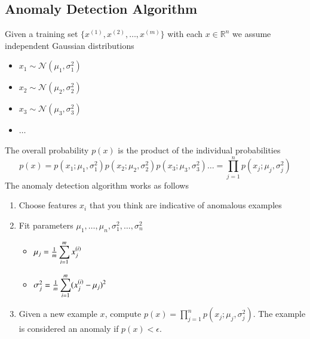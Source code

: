 \documentclass[a4paper,twoside,10pt]{article}
\begin{document}
\subsection{Anomaly Detection Algorithm}\label{cha:anomaly}
Given a training set $\{x^{(1)},x^{(2)},\ldots,x^{(m)}\}$ with each $x\in\mathbb{R}^n$
we assume independent Gaussian distributions
\begin{itemize}
\item $x_1\sim\mathcal{N}(\mu_1,\sigma^2_1)$
\item $x_2\sim\mathcal{N}(\mu_2,\sigma^2_2)$
\item $x_3\sim\mathcal{N}(\mu_3,\sigma^2_3)$
\item $\ldots$
\end{itemize}
The overall probability $p(x)$ is the product of the individual probabilities
\begin{equation*}
  p(x)=p(x_1;\mu_1,\sigma_1^2) p(x_2;\mu_2,\sigma_2^2) p(x_3;\mu_3,\sigma_3^2) \ldots=
  \prod_{j=1}^n p(x_j;\mu_j,\sigma_j^2)
\end{equation*}
The anomaly detection algorithm works as follows
\begin{enumerate}
  \item Choose features $x_i$ that you think are indicative of anomalous examples
  \item Fit parameters $\mu_1,\ldots,\mu_n,\sigma_1^2,\ldots,\sigma_n^2$
    \begin{itemize}
    \item $\mu_j=\frac{1}{m}\displaystyle\sum_{i=1}^mx^{(i)}_j$
    \item $\sigma_j^2=\frac{1}{m}\displaystyle\sum_{i=1}^m(x^{(i)}_j-\mu_j)^2$
    \end{itemize}
  \item Given a new example $x$, compute $p(x)=\prod_{j=1}^n p(x_j;\mu_j,\sigma_j^2)$. The example is considered an anomaly if $p(x)<\epsilon$.
\end{enumerate}
\end{document}
